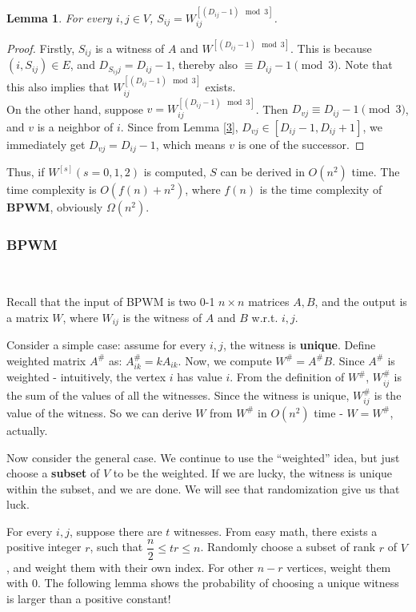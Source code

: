 \documentclass[11pt]{article}
\theoremstyle{plain}
\newtheorem{lemma}{Lemma}[section]
\begin{document}
\begin{lemma}
\label{5}
For every $i,j\in V$, $S_{ij}=W^{[(D_{ij}-1)\mod 3]}_{ij}$.
\end{lemma}
\begin{proof}
Firstly, $S_{ij}$ is a witness of $A$ and $W^{[(D_{ij}-1)\mod 3]}$. This is because $(i,S_{ij})\in E$, and $D_{S_{ij}j}=D_{ij}-1$, thereby also $\equiv D_{ij}-1\pmod 3$. Note that this also implies that $W^{[(D_{ij}-1)\mod 3]}_{ij}$ exists.\\
On the other hand, suppose $v=W^{[(D_{ij}-1)\mod 3]}_{ij}$. Then $D_{vj}\equiv D_{ij}-1\pmod 3$, and $v$ is a neighbor of $i$. Since from Lemma \ref{3}, $D_{vj}\in [D_{ij}-1,D_{ij}+1]$, we immediately get $D_{vj}=D_{ij}-1$, which means $v$ is one of the successor.
\end{proof}

Thus, if $W^{[s]}(s=0,1,2)$ is computed, $S$ can be derived in $O(n^2)$ time. The time complexity is $O(f(n)+n^2)$, where $f(n)$ is the time complexity of \textbf{BPWM}, obviously $\Omega(n^2)$.

\subsubsection{BPWM}
\label{sec:bpwm}\

Recall that the input of BPWM is two 0-1 $n\times n$ matrices $A,B$, and the output is a matrix $W$, where $W_{ij}$ is the witness of $A$ and $B$ w.r.t. $i,j$.

Consider a simple case: assume for every $i,j$, the witness is \textbf{unique}. Define weighted matrix $A^{\#}$ as: $A^{\#}_{ik}=kA_{ik}$. Now, we compute $W^{\#}=A^{\#}B$. Since $A^{\#}$ is weighted - intuitively, the vertex $i$ has value $i$. From the definition of $W^{\#}$, $W^{\#}_{ij}$ is the sum of the values of all the witnesses. Since the witness is unique, $W^{\#}_{ij}$ is the value of the witness. So we can derive $W$ from $W^{\#}$ in $O(n^2)$ time - $W=W^{\#}$, actually.

Now consider the general case. We continue to use the ``weighted'' idea, but just choose a \textbf{subset} of $V$ to be the weighted. If we are lucky, the witness is unique within the subset, and we are done. We will see that randomization give us that luck.

For every $i,j$, suppose there are $t$ witnesses. From easy math, there exists a positive integer $r$, such that $\dfrac{n}{2}\le tr\le n$. Randomly choose a subset of rank $r$ of $V$, and weight them with their own index. For other $n-r$ vertices, weight them with $0$. The following lemma shows the probability of choosing a unique witness is larger than a positive constant!
\end{document}
